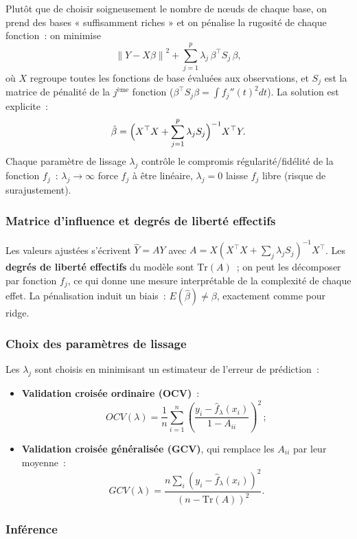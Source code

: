 \documentclass[11pt,letterpaper]{article}
\begin{document}
Plutôt que de choisir soigneusement le nombre de n\oe uds de chaque base, on prend des bases « suffisamment riches » et on pénalise la rugosité de chaque fonction~: on minimise
$$\left\|Y - X\beta\right\|^2 + \sum_{j=1}^p\lambda_j\,\beta^\top S_j\,\beta,$$
où $X$ regroupe toutes les fonctions de base évaluées aux observations, et $S_j$ est la matrice de pénalité de la $j^{\text{ème}}$ fonction ($\beta^\top S_j\beta = \int f_j''(t)^2dt$). La solution est explicite~:
$$\hat\beta = \Bigl(X^\top X + \sum_{j=1}^p\lambda_j S_j\Bigr)^{-1}X^\top Y.$$
Chaque paramètre de lissage $\lambda_j$ contrôle le compromis régularité/fidélité de la fonction $f_j$~: $\lambda_j\to\infty$ force $f_j$ à être linéaire, $\lambda_j = 0$ laisse $f_j$ libre (risque de surajustement).

\subsubsection{Matrice d'influence et degrés de liberté effectifs}

Les valeurs ajustées s'écrivent $\hat Y = AY$ avec $A = X(X^\top X + \sum_j\lambda_j S_j)^{-1}X^\top$. Les \textbf{degrés de liberté effectifs} du modèle sont $\mathrm{Tr}(A)$~; on peut les décomposer par fonction $f_j$, ce qui donne une mesure interprétable de la complexité de chaque effet. La pénalisation induit un biais~: $E(\hat\beta)\neq\beta$, exactement comme pour ridge.

\subsubsection{Choix des paramètres de lissage}

Les $\lambda_j$ sont choisis en minimisant un estimateur de l'erreur de prédiction~:
\begin{itemize}
\item \textbf{Validation croisée ordinaire (OCV)}~:
$$OCV(\lambda) = \frac{1}{n}\sum_{i=1}^n\left(\frac{y_i - \hat f_\lambda(x_i)}{1 - A_{ii}}\right)^2\,;$$
\item \textbf{Validation croisée généralisée (GCV)}, qui remplace les $A_{ii}$ par leur moyenne~:
$$GCV(\lambda) = \frac{n\sum_i(y_i - \hat f_\lambda(x_i))^2}{\left(n - \mathrm{Tr}(A)\right)^2}.$$
\end{itemize}

\subsubsection{Inférence}
\end{document}
